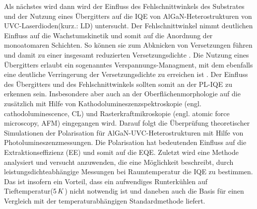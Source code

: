 \newline
Als nächstes wird dann wird der Einfluss des Fehlschnittwinkels des Substrates und der Nutzung eines Übergitters auf die IQE von AlGaN-Heterostrukturen von UVC-Laserdioden(kurz.: LD) untersucht. Der Fehlschnittwinkel nimmt deutlichen Einfluss auf die Wachstumskinetik und somit auf die Anordnung der monoatomaren Schichten. So können sie zum Abknicken von Versetzungen führen und damit zu einer insgesamt reduzierten Versetzungsdichte \cite{jeschke}. Die Nutzung eines Übergitters erlaubt ein sogenanntes Verspannungs-Managment, mit dem ebenfalls eine deutliche Verringerung der Versetzungsdichte zu erreichen ist \cite{doi:10.1063/1.2136424}. Der Einfluss des Übergitters und des Fehlschnittwinkels sollten somit an der PL-IQE zu erkennen sein. Insbesondere aber auch an der Oberflächenmorphologie auf die zusätzlich mit Hilfe von Kathodolumineszenzspektroskopie (engl. cathodoluminescence, CL) und Rasterkraftmikroskopie (engl. atomic force microscopy, AFM) eingegangen wird.
\newline
Darauf folgt die Überprüfung theoretischer Simulationen der Polarisation für AlGaN-UVC-Heterostrukturen mit Hilfe von Photolumineszenzmessungen. Die Polarisation hat bedeutenden Einfluss auf die Extraktionseffizienz (EE) und somit auf die EQE.
\newline
Zuletzt wird eine Methode analysiert und versucht anzuwenden, die eine Möglichkeit beschreibt, durch leistungsdichteabhängige Messungen bei Raumtemperatur die IQE zu bestimmen. Das ist insofern ein Vorteil, dass ein aufwendiges Runterkühlen auf Tieftemperatur($5 \thinspace K$) nicht notwendig ist und daneben auch die Basis für einen Vergleich mit der temperaturabhängigen Standardmethode liefert.













